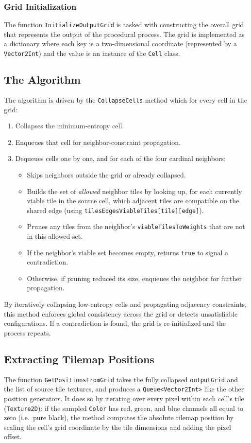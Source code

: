 \documentclass[a4paper, 12pt, one column, aas_macros]{article}
\begin{document}
\subsubsection{Grid Initialization}
The function \texttt{InitializeOutputGrid} is tasked with constructing the overall grid that represents the output of the procedural process. The grid is implemented as a dictionary where each key is a two-dimensional coordinate (represented by a \texttt{Vector2Int}) and the value is an instance of the \texttt{Cell} class.

\subsection{The Algorithm}
The algorithm is driven by the \texttt{CollapseCells} method which for every cell in the grid:
\begin{enumerate}
  \item Collapses the minimum‐entropy cell.
  \item Enqueues that cell for neighbor‐constraint propagation.
  \item Dequeues cells one by one, and for each of the four cardinal neighbors:
    \begin{itemize}
      \item Skips neighbors outside the grid or already collapsed.
      \item Builds the set of \emph{allowed} neighbor tiles by looking up, for each currently viable tile in the source cell, which adjacent tiles are compatible on the shared edge (using \texttt{tilesEdgesViableTiles[tile][edge]}).
      \item Prunes any tiles from the neighbor’s \texttt{viableTilesToWeights} that are not in this allowed set.
      \item If the neighbor’s viable set becomes empty, returns \texttt{true} to signal a contradiction.
      \item Otherwise, if pruning reduced its size, enqueues the neighbor for further propagation.
    \end{itemize}
\end{enumerate}

By iteratively collapsing low‐entropy cells and propagating adjacency constraints, this method enforces global consistency across the grid or detects unsatisfiable configurations. If a contradiction is found, the grid is re-initialized and the process repeats.

\subsection{Extracting Tilemap Positions}
The function \texttt{GetPositionsFromGrid} takes the fully collapsed \texttt{outputGrid} and the list of source tile textures, and produces a \texttt{Queue<Vector2Int>} like the other position generators. It does so by iterating over every pixel within each cell's tile (\texttt{Texture2D}): if the sampled \texttt{Color} has red, green, and blue channels all equal to zero (i.e.\ pure black), the method computes the absolute tilemap position by scaling the cell’s grid coordinate by the tile dimensions and adding the pixel offset.
\end{document}
